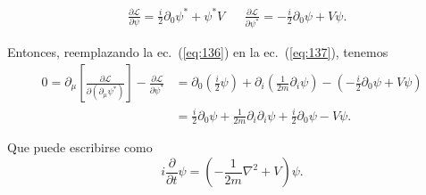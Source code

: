 \begin{subappendices}
\begin{frame}
\begin{align}
  &\frac{\partial\mathcal{L}}{\partial\psi}=\frac{i}{2}\partial_0\psi^*+\psi^*V&&\frac{\partial\mathcal{L}}{\partial\psi^*}=-\frac{i}{2}\partial_0\psi+V\psi.\nonumber
\end{align}
\end{frame}
Entonces, reemplazando la ec.~(\ref{eq:136}) en la ec.~(\ref{eq:137}), tenemos
\begin{align}
 0=\partial_\mu\left[\frac{\partial\mathcal{L}}{\partial(\partial_\mu\psi^*)}\right]-\frac{\partial\mathcal{L}}{\partial\psi^*}
 &=\partial_0\left(\frac{i}{2}\psi\right)+\partial_i\left(\frac{1}{2m}\partial_i\psi\right)
  -\left(-\frac{i}{2}\partial_0\psi+V\psi\right)\nonumber\\
  &=\frac{i}{2}\partial_0\psi+\frac{1}{2m}\partial_i\partial_i\psi+\frac{i}{2}\partial_0\psi-V\psi.
\end{align}

Que puede escribirse como
\begin{equation}
  \label{eq:133}
  i\frac{\partial}{\partial t}\psi=
  \left(
    -\frac{1}{2m}\nabla^2+V
  \right)\psi.
\end{equation}


\end{subappendices}
